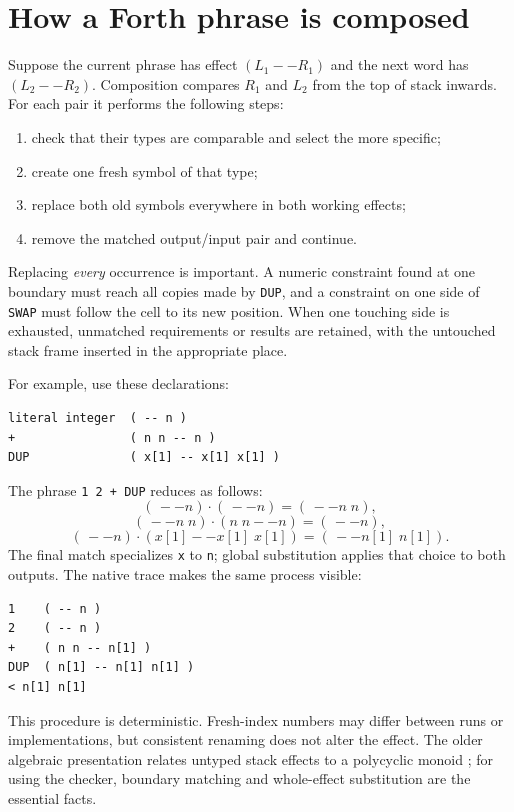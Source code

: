 \documentclass[10pt,a4paper]{article}
\newcommand{\seq}{\mathbin{\cdot}}
\begin{document}
\section{How a Forth phrase is composed}

Suppose the current phrase has effect $(L_1--R_1)$ and the next word has
$(L_2--R_2)$.  Composition compares $R_1$ and $L_2$ from the top of stack
inwards.  For each pair it performs the following steps:
\begin{enumerate}
  \item check that their types are comparable and select the more specific;
  \item create one fresh symbol of that type;
  \item replace both old symbols everywhere in both working effects;
  \item remove the matched output/input pair and continue.
\end{enumerate}
Replacing \emph{every} occurrence is important.  A numeric constraint found at
one boundary must reach all copies made by \texttt{DUP}, and a constraint on
one side of \texttt{SWAP} must follow the cell to its new position.  When one
touching side is exhausted, unmatched requirements or results are retained,
with the untouched stack frame inserted in the appropriate place.

For example, use these declarations:
\begin{lstlisting}
literal integer  ( -- n )
+                ( n n -- n )
DUP              ( x[1] -- x[1] x[1] )
\end{lstlisting}
The phrase \texttt{1 2 + DUP} reduces as follows:
\[
 (\,--n)\seq(\,--n)=(\,--n\;n),
\]
\[
 (\,--n\;n)\seq(n\;n--n)=(\,--n),
\]
\[
 (\,--n)\seq(x[1]--x[1]\;x[1])
       =(\,--n[1]\;n[1]).
\]
The final match specializes \texttt{x} to \texttt{n}; global substitution
applies that choice to both outputs.  The native trace makes the same process
visible:
\begin{lstlisting}
1    ( -- n )
2    ( -- n )
+    ( n n -- n[1] )
DUP  ( n[1] -- n[1] n[1] )
< n[1] n[1]
\end{lstlisting}

This procedure is deterministic.  Fresh-index numbers may differ between
runs or implementations, but consistent renaming does not alter the effect.
The older algebraic presentation relates untyped stack effects to a
polycyclic monoid \cite{poial1991,poial1994}; for using the checker, boundary
matching and whole-effect substitution are the essential facts.
\end{document}
